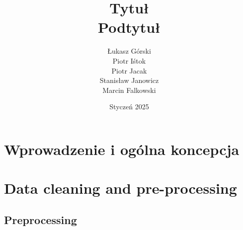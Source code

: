 \documentclass[11pt, letterpaper]{article}
\title{\textbf {Tytuł} \\ \large Podtytuł}
\author{Łukasz Górski \\ Piotr Iśtok \\ Piotr Jacak \\ Stanisław Janowicz \\ Marcin Falkowski}
\date{Styczeń 2025}
\begin{document}
\maketitle

\newpage
\tableofcontents
\newpage

\section{Wprowadzenie i ogólna koncepcja}
\section{Data cleaning and pre-processing}
\subsection{Preprocessing}
\end{document}
